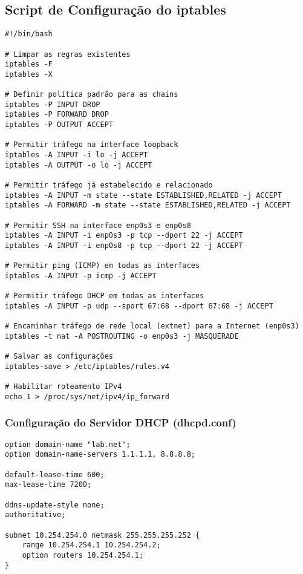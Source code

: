 \documentclass{article}
\begin{document}
\subsection{Script de Configuração do iptables}
\begin{verbatim}
#!/bin/bash

# Limpar as regras existentes
iptables -F
iptables -X

# Definir política padrão para as chains
iptables -P INPUT DROP
iptables -P FORWARD DROP
iptables -P OUTPUT ACCEPT

# Permitir tráfego na interface loopback
iptables -A INPUT -i lo -j ACCEPT
iptables -A OUTPUT -o lo -j ACCEPT

# Permitir tráfego já estabelecido e relacionado
iptables -A INPUT -m state --state ESTABLISHED,RELATED -j ACCEPT
iptables -A FORWARD -m state --state ESTABLISHED,RELATED -j ACCEPT

# Permitir SSH na interface enp0s3 e enp0s8
iptables -A INPUT -i enp0s3 -p tcp --dport 22 -j ACCEPT
iptables -A INPUT -i enp0s8 -p tcp --dport 22 -j ACCEPT

# Permitir ping (ICMP) em todas as interfaces
iptables -A INPUT -p icmp -j ACCEPT

# Permitir tráfego DHCP em todas as interfaces
iptables -A INPUT -p udp --sport 67:68 --dport 67:68 -j ACCEPT

# Encaminhar tráfego de rede local (extnet) para a Internet (enp0s3)
iptables -t nat -A POSTROUTING -o enp0s3 -j MASQUERADE

# Salvar as configurações
iptables-save > /etc/iptables/rules.v4

# Habilitar roteamento IPv4
echo 1 > /proc/sys/net/ipv4/ip_forward
\end{verbatim}

\subsubsection{Configuração do Servidor DHCP (dhcpd.conf)}
\begin{verbatim}
option domain-name "lab.net";
option domain-name-servers 1.1.1.1, 8.8.8.8;

default-lease-time 600;
max-lease-time 7200;

ddns-update-style none;
authoritative;

subnet 10.254.254.0 netmask 255.255.255.252 {
    range 10.254.254.1 10.254.254.2;
    option routers 10.254.254.1;
}
\end{verbatim}
\end{document}
